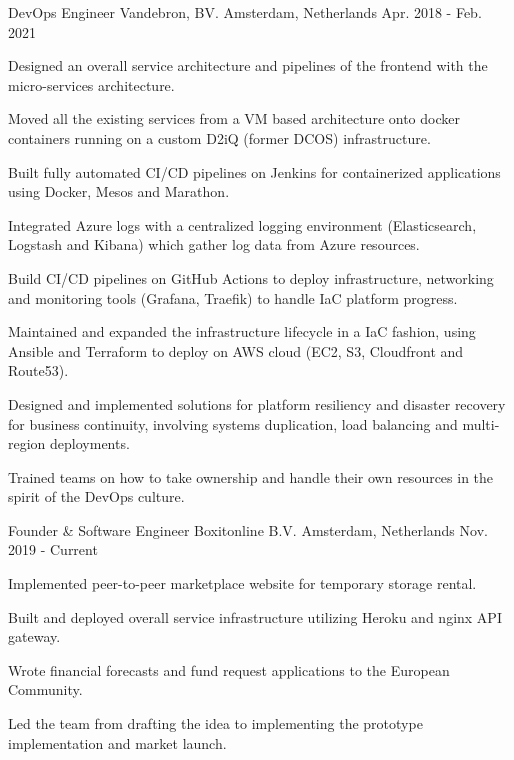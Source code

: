 \begin{cventries}
  \cventry
    {DevOps Engineer} %
    {Vandebron, BV.} %
    {Amsterdam, Netherlands} %
    {Apr. 2018 - Feb. 2021} %
    {
      \begin{cvitems} %
        \item {Designed an overall service architecture and pipelines of the frontend with the micro-services architecture.}
        \item {Moved all the existing services from a VM based architecture onto docker containers running on a custom D2iQ (former DCOS) infrastructure.}
        \item {Built fully automated CI/CD pipelines on Jenkins for containerized applications using Docker, Mesos and Marathon.}
        \item {Integrated Azure logs with a centralized logging environment (Elasticsearch, Logstash and Kibana) which gather log data from Azure resources.}
        \item {Build CI/CD pipelines on GitHub Actions to deploy infrastructure, networking and monitoring tools (Grafana, Traefik) to handle IaC platform progress.}
        \item {Maintained and expanded the infrastructure lifecycle in a IaC fashion, using Ansible and Terraform to deploy on AWS cloud (EC2, S3, Cloudfront and Route53).}
        \item {Designed and implemented solutions for platform resiliency and disaster recovery for business continuity, involving systems duplication, load balancing and multi-region deployments.}
        \item {Trained teams on how to take ownership and handle their own resources in the spirit of the DevOps culture.}
      \end{cvitems}
    }

  \cventry
    {Founder \& Software Engineer} %
    {Boxitonline B.V.} %
    {Amsterdam, Netherlands} %
    {Nov. 2019 - Current} %
    {
      \begin{cvitems} %
        \item {Implemented peer-to-peer marketplace website for temporary storage rental.}
        \item {Built and deployed overall service infrastructure utilizing Heroku and nginx API gateway.}
        \item {Wrote financial forecasts and fund request applications to the European Community.}
        \item {Led the team from drafting the idea to implementing the prototype implementation and market launch.}
      \end{cvitems}  
    }  
      

\end{cventries}
